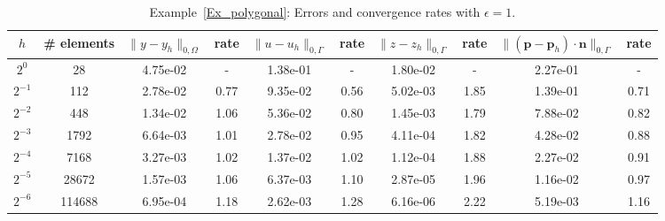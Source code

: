 \documentclass[a4paper,10pt]{article}
\newcommand{\bp}{{\mathbf{p}}}
\numberwithin{theorem}{section}
\begin{document}
\begin{table}[H]
\centering
\caption{Example~\ref{Ex_polygonal}: Errors and convergence rates with $\epsilon=1$.}
\resizebox{\textwidth}{!}
{%
\begin{tabular}{c |c | c c | c c | c c | c c}
$h$
&\# elements 
& $\|y-y_h\|_{0,\Omega}$ & rate
& $\|u-u_h\|_{0,\Gamma}$ & rate
& $\|z-z_h\|_{0,\Gamma}$ & rate
& $\|(\bp-\bp_h)\cdot \mathbf n\|_{0,\Gamma}$ & rate \\
\hline
$2^{0}$
&28     
& 4.75e-02 & -    
& 1.38e-01 & -    
& 1.80e-02 & -    
& 2.27e-01 & -    \\

$2^{-1}$
&112    
& 2.78e-02 & 0.77 
& 9.35e-02 & 0.56 
& 5.02e-03 & 1.85 
& 1.39e-01 & 0.71 \\

$2^{-2}$
&448    
& 1.34e-02 & 1.06 
& 5.36e-02 & 0.80 
& 1.45e-03 & 1.79 
& 7.88e-02 & 0.82 \\

$2^{-3}$
&1792   
& 6.64e-03 & 1.01 
& 2.78e-02 & 0.95 
& 4.11e-04 & 1.82 
& 4.28e-02 & 0.88 \\

$2^{-4}$
&7168   
& 3.27e-03 & 1.02 
& 1.37e-02 & 1.02 
& 1.12e-04 & 1.88 
& 2.27e-02 & 0.91 \\

$2^{-5}$
&28672  
& 1.57e-03 & 1.06 
& 6.37e-03 & 1.10 
& 2.87e-05 & 1.96 
& 1.16e-02 & 0.97 \\

$2^{-6}$
&114688 
& 6.95e-04 & 1.18 
& 2.62e-03 & 1.28 
& 6.16e-06 & 2.22 
& 5.19e-03 & 1.16 \\

\hline
\end{tabular}
}
\label{Ex_polygonal_combined_table_eps0}
\end{table}
\end{document}

